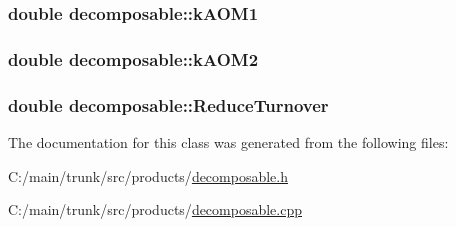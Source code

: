 \label{classdecomposable_ae93cd4d9e67eedb64409c38bb8d4dbef}
\hypertarget{classdecomposable_a5b4aff39ba4d423eeffc4515ef5cea2a}{
\subsubsection[{kAOM1}]{\setlength{\rightskip}{0pt plus 5cm}double {\bf decomposable::kAOM1}}}
\label{classdecomposable_a5b4aff39ba4d423eeffc4515ef5cea2a}
\hypertarget{classdecomposable_aafe6099ccfe324ee3c2e2437e181cf49}{
\subsubsection[{kAOM2}]{\setlength{\rightskip}{0pt plus 5cm}double {\bf decomposable::kAOM2}}}
\label{classdecomposable_aafe6099ccfe324ee3c2e2437e181cf49}
\hypertarget{classdecomposable_a164e873eb8d7c67064d143578f77a886}{
\subsubsection[{ReduceTurnover}]{\setlength{\rightskip}{0pt plus 5cm}double {\bf decomposable::ReduceTurnover}}}
\label{classdecomposable_a164e873eb8d7c67064d143578f77a886}


The documentation for this class was generated from the following files:\begin{DoxyCompactItemize}
\item 
C:/main/trunk/src/products/\hyperlink{decomposable_8h}{decomposable.h}\item 
C:/main/trunk/src/products/\hyperlink{decomposable_8cpp}{decomposable.cpp}\end{DoxyCompactItemize}
